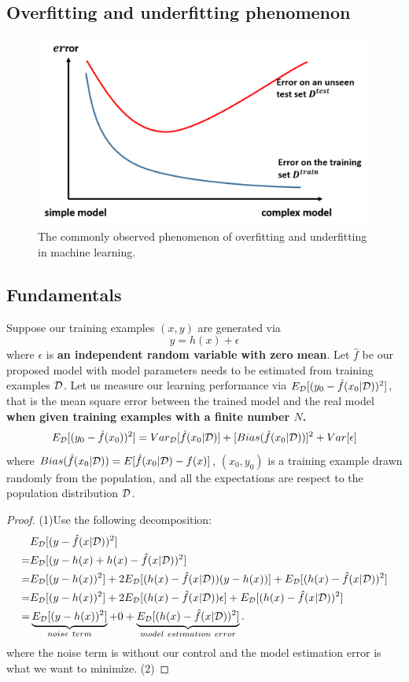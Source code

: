 \begin{refsection}
\subsection{Overfitting and underfitting phenomenon}

\begin{figure}
	\centering
	\includegraphics[width=0.6\linewidth]{../figures/statisticalLearning/supervisedLearningPrinciples/underFittingOverfittingDemo}
	\caption{The commonly observed phenomenon of overfitting and underfitting in machine learning. }
	\label{fig:underfittingoverfittingdemo}
\end{figure}





\subsection{Fundamentals}

\begin{lemma}\cite[34]{james2013introduction}
Suppose our training examples $(x,y)$ are generated via
$$y = h(x) + \epsilon$$
where $\epsilon$ is \textbf{an independent random variable with zero mean}. Let $\hat{f}$ be our proposed model with model parameters needs to be estimated from training examples $\mathcal{D}$. Let us measure our learning performance via $E_{\mathcal{D}}[(y_0 - \hat{f}(x_0|\mathcal{D}))^2]$, that is the mean square error between the trained model and the real model \textbf{when given training examples with a finite number $N$.}
$$E_{\mathcal{D}}[(y_0 - \hat{f}(x_0))^2] = Var_{\mathcal{D}}[\hat{f}(x_0|\mathcal{D})] + [Bias(\hat{f}(x_0|\mathcal{D}))]^2 + Var[\epsilon]$$
where
$Bias(\hat{f}(x_0|\mathcal{D})) = E[\hat{f}(x_0|\mathcal{D}) - f(x)]$, $(x_0,y_0)$ is a training example drawn randomly from the population, and all the expectations are respect to the population distribution $\mathcal{D}$.
\end{lemma}
\begin{proof}
(1)Use the following decomposition:
\begin{align*}
 &E_{\mathcal{D}}[(y - \hat{f}(x|\mathcal{D}))^2] \\
=&E_{\mathcal{D}}[(y - h(x) + h(x) - \hat{f}(x|\mathcal{D}))^2] \\
=&E_{\mathcal{D}}[(y - h(x))^2] + 2E_{\mathcal{D}}[(h(x) - \hat{f}(x|\mathcal{D}))(y - h(x))] + E_{\mathcal{D}}[(h(x) - \hat{f}(x|\mathcal{D}))^2] \\
=&E_{\mathcal{D}}[(y - h(x))^2] + 2E_{\mathcal{D}}[(h(x) - \hat{f}(x|\mathcal{D}))\epsilon] + E_{\mathcal{D}}[(h(x) - \hat{f}(x|\mathcal{D}))^2] \\
=&\underbrace{E_{\mathcal{D}}[(y - h(x))^2]}_{noise~term}+ 0 + \underbrace{E_{\mathcal{D}}[(h(x) - \hat{f}(x|\mathcal{D}))^2]}_{model~estimation~error}. 
\end{align*}
where the noise term is without our control and the model estimation error is what we want to minimize.
(2)


\end{proof}
\end{refsection}
